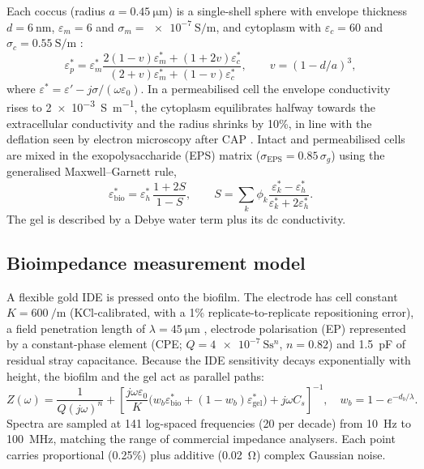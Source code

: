 \documentclass[pdflatex,sn-mathphys-num]{sn-jnl}%
\begin{document}
Each coccus (radius $a=\SI{0.45}{\micro\metre}$) is a single-shell sphere with envelope thickness $d=\SI{6}{\nano\metre}$, $\varepsilon_m=6$ and $\sigma_m=\SI{e-7}{\siemens\per\metre}$, and cytoplasm with $\varepsilon_c=60$ and $\sigma_c=\SI{0.55}{\siemens\per\metre}$ \cite{asami2002,markx1999}:
\begin{equation}
\varepsilon_p^* = \varepsilon_m^* \frac{2(1-v)\varepsilon_m^* + (1+2v)\varepsilon_c^*}{(2+v)\varepsilon_m^* + (1-v)\varepsilon_c^*}, \qquad v = (1-d/a)^3,
\end{equation}
where $\varepsilon^* = \varepsilon' - j\sigma/(\omega\varepsilon_0)$. In a permeabilised cell the envelope conductivity rises to \SI{2e-3}{\siemens\per\metre}, the cytoplasm equilibrates halfway towards the extracellular conductivity and the radius shrinks by 10\%, in line with the deflation seen by electron microscopy after CAP \cite{baz2023}. Intact and permeabilised cells are mixed in the exopolysaccharide (EPS) matrix ($\sigma_{\mathrm{EPS}} = 0.85\,\sigma_g$) using the generalised Maxwell--Garnett rule,
\begin{equation}
\varepsilon_{\mathrm{bio}}^* = \varepsilon_h^*\, \frac{1+2S}{1-S}, \qquad S = \sum_k \phi_k \frac{\varepsilon_k^* - \varepsilon_h^*}{\varepsilon_k^* + 2\varepsilon_h^*}.
\end{equation}
The gel is described by a Debye water term plus its dc conductivity.

\subsection{Bioimpedance measurement model}\label{sec:ide}

A flexible gold IDE is pressed onto the biofilm. The electrode has cell constant $K=\SI{600}{\per\metre}$ (KCl-calibrated, with a 1\% replicate-to-replicate repositioning error), a field penetration length of $\lambda=\SI{45}{\micro\metre}$ \cite{igreja2004}, electrode polarisation (EP) represented by a constant-phase element (CPE; $Q=\SI{4e-7}{\siemens\second\tothe{n}}$, $n=0.82$) and \SI{1.5}{\pico\farad} of residual stray capacitance. Because the IDE sensitivity decays exponentially with height, the biofilm and the gel act as parallel paths:
\begin{equation}
Z(\omega) = \frac{1}{Q (j\omega)^n} + \left[\frac{j\omega\varepsilon_0}{K}\big(w_b \varepsilon_{\mathrm{bio}}^* + (1-w_b)\varepsilon_{\mathrm{gel}}^*\big) + j\omega C_s\right]^{-1}, \quad w_b = 1-e^{-d_b/\lambda}.
\label{eq:ide}
\end{equation}
Spectra are sampled at 141 log-spaced frequencies (20 per decade) from \SI{10}{\hertz} to \SI{100}{\mega\hertz}, matching the range of commercial impedance analysers. Each point carries proportional (0.25\%) plus additive (\SI{0.02}{\ohm}) complex Gaussian noise.
\end{document}
